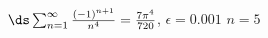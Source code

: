 {$\ds \sum_{n=1}^\infty \frac{(-1)^{n+1}}{n^4} = \frac{7\pi^4}{720}$, \quad $\epsilon = 0.001$
}
{$n=5$
}